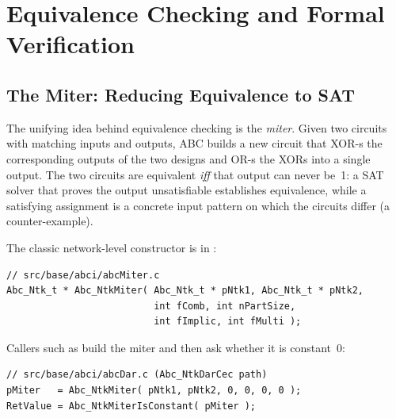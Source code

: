 \chapter{Equivalence Checking and Formal Verification}
\label{ch:proof}


\section{The Miter: Reducing Equivalence to SAT}

The unifying idea behind equivalence checking is the \emph{miter}. Given two
circuits with matching inputs and outputs, ABC builds a new circuit that
XOR-s the corresponding outputs of the two designs and OR-s the XORs into a
single output. The two circuits are equivalent \emph{iff} that output can
never be~1: a SAT solver that proves the output unsatisfiable establishes
equivalence, while a satisfying assignment is a concrete input pattern on
which the circuits differ (a counter-example).

The classic network-level constructor is  in
:

\begin{lstlisting}[style=abccode]
// src/base/abci/abcMiter.c
Abc_Ntk_t * Abc_NtkMiter( Abc_Ntk_t * pNtk1, Abc_Ntk_t * pNtk2,
                          int fComb, int nPartSize,
                          int fImplic, int fMulti );
\end{lstlisting}

Callers such as  build the miter and then ask
whether it is constant~0:

\begin{lstlisting}[style=abccode]
// src/base/abci/abcDar.c (Abc_NtkDarCec path)
pMiter   = Abc_NtkMiter( pNtk1, pNtk2, 0, 0, 0, 0 );
RetValue = Abc_NtkMiterIsConstant( pMiter );
\end{lstlisting}

